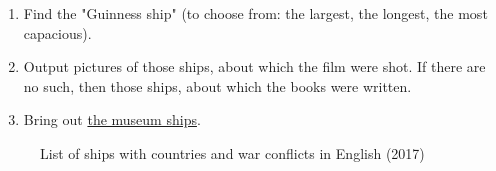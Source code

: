 \begin{enumerate}
  \item Find the "Guinness ship" (to choose from: the largest, the longest, the most capacious).
  \item Output pictures of those ships, about which the film were shot. If there are no such, then those ships, about which the books were written.
  \item Bring out \href{https://en.wikipedia.org/wiki/List_of_museum_ships}{the museum ships}.
\end{enumerate}



\begin{figure*}[h]
  {
  \setlength{\fboxsep}{0pt}%
  \setlength{\fboxrule}{1pt}%
  }
    \caption{List of ships with countries and war conflicts in English (2017)}%
    \label{fig:ships_by_country_and_conflict}%
\end{figure*}
